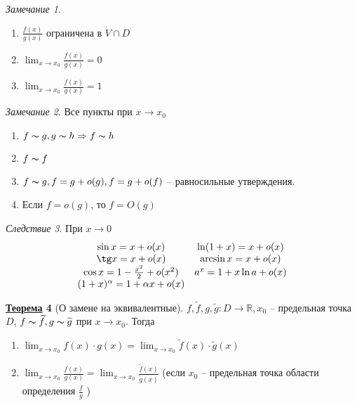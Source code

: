 \documentclass[12pt]{article}
\newenvironment{MyList}[1][4pt]{
  \begin{enumerate}[1.]
  \setlength{\parskip}{0pt}
  \setlength{\itemsep}{#1}
}{       
  \end{enumerate}
}
\def\R{\mathbb{R}}       %
\def\SO{\Rightarrow}     %
\theoremstyle{definition} %
\newtheorem{Thm}{\underline{Теорема}}[subsection] %
\theoremstyle{plain} %
\theoremstyle{remark} %
\newtheorem{Cons}[Thm]{Следствие} %
\newtheorem{Rem}[Thm]{Замечание} %
\begin{document}
\begin{Rem}
    \begin{MyList}
        \item $ \frac{f(x)}{g(x)}$ ограничена в $\dot{V} \cap D$
        \item $\lim_{x \to x_0} \frac{f(x)}{g(x)} = 0$
        \item $\lim_{x \to x_0} \frac{f(x)}{g(x)} = 1$    
    \end{MyList}
\end{Rem}

\begin{Rem}
    Все пункты при $x \to x_0$ 
    \begin{MyList}
        \item $f \thicksim g, g \thicksim h \SO f \thicksim h$ 
        \item $f \thicksim f$ 
        \item $f \thicksim g, f = g + o(g), f = g + o(f)$ -- равносильные утверждения.
        \item Если $f = o(g)$, то $f = O(g)$ 
    \end{MyList}
\end{Rem}

\begin{Cons}
    При $x \to 0$
    \[
    \begin{array}{cc}
    \sin x = x + o(x) & \ln(1 + x) = x + o(x)  \\ 
    \tg x = x + o(x)  & \arcsin x = x + o(x) \\ 
    \cos x = 1 - \frac{x^2}{2} + o(x^2)  & a^x = 1 + x\ln a + o(x)  \\ 
    (1 + x)^\alpha = 1 + \alpha x + o(x)  &
    \end{array}
    \]
\end{Cons}

\begin{Thm}[О замене на эквивалентные]
    $f, \widetilde{f}, g, \widetilde{g} : D \to \R, x_0$ -- предельная точка $D$, $f \thicksim \widetilde{f}, g \thicksim \widetilde{g}$ при $x \to x_0$. 
    Тогда
    \begin{MyList}
        \item $\lim_{x \to x_0} f(x) \cdot g(x) = \lim_{x \to x_0} \widetilde{f}(x) \cdot \widetilde{g}(x)$
        \item $\lim_{x \to x_0} \frac{f(x)}{g(x)} = \lim_{x \to x_0} \frac{\widetilde{f}(x)}{\widetilde{g}(x)}$ (если $x_0$ -- предельная точка области определения $\frac{f}{g}$ )  
    \end{MyList}
\end{Thm}
\end{document}
